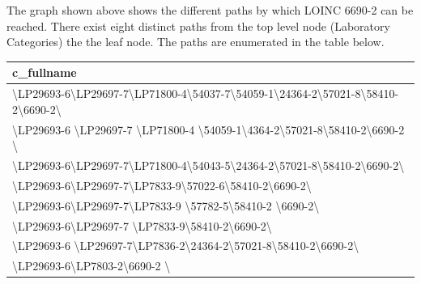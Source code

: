 \documentclass[a0paper,portrait]{baposter}
\begin{document}
\begin{poster}
{\begin{center}
\end{center}
    The graph shown above shows the different paths by which LOINC 6690-2 can be reached. There exist eight distinct paths from the top level node (Laboratory Categories) the the leaf node. The paths are enumerated in the table below.
\begin{center}
\begin{tabular}{|l|}\hline
      c\_fullname \\ \hline 
      {\footnotesize 
       \textbackslash LP29693-6\textbackslash LP29697-7\textbackslash LP71800-4\textbackslash 54037-7\textbackslash 54059-1\textbackslash 24364-2\textbackslash 57021-8\textbackslash 58410-2\textbackslash 6690-2\textbackslash} \\ \hline 
      {\footnotesize \textbackslash LP29693-6 \textbackslash LP29697-7 \textbackslash LP71800-4 \textbackslash 54059-1\textbackslash 4364-2\textbackslash 57021-8\textbackslash 58410-2\textbackslash 6690-2 \textbackslash }\\ \hline
      {\footnotesize \textbackslash LP29693-6\textbackslash LP29697-7\textbackslash LP71800-4\textbackslash 54043-5\textbackslash 24364-2\textbackslash 57021-8\textbackslash 58410-2\textbackslash 6690-2\textbackslash
      } \\ \hline
      {\footnotesize \textbackslash LP29693-6\textbackslash LP29697-7\textbackslash LP7833-9\textbackslash 57022-6\textbackslash 58410-2\textbackslash 6690-2\textbackslash 
} \\ \hline
{\footnotesize 
\textbackslash LP29693-6\textbackslash LP29697-7\textbackslash LP7833-9 \textbackslash 57782-5\textbackslash 58410-2 \textbackslash 6690-2\textbackslash } \\ \hline 
{\footnotesize 
\textbackslash LP29693-6\textbackslash LP29697-7 \textbackslash LP7833-9\textbackslash 58410-2\textbackslash 6690-2\textbackslash } \\ \hline 
{\footnotesize 
\textbackslash LP29693-6 \textbackslash LP29697-7\textbackslash LP7836-2\textbackslash 24364-2\textbackslash 57021-8\textbackslash 58410-2\textbackslash 6690-2\textbackslash } \\ \hline
{\footnotesize
\textbackslash LP29693-6\textbackslash LP7803-2\textbackslash 6690-2 \textbackslash } \\ \hline 

      \end{tabular}
      \end{center}

}
\end{poster}
\end{document}
